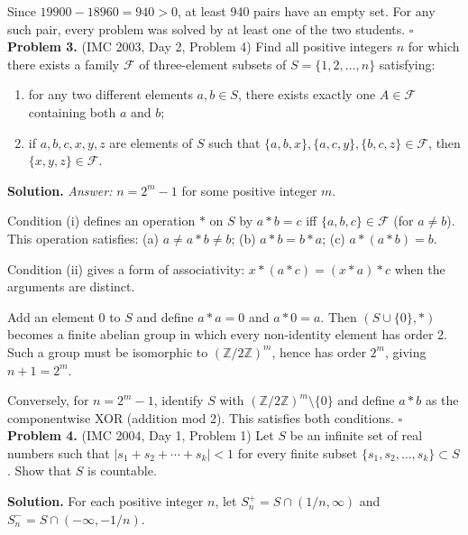\documentclass{article}
\begin{document}
Since \( 19900 - 18960 = 940 > 0 \), at least 940 pairs have an empty set. For any such pair, every problem was solved by at least one of the two students. \hfill\(\square\)
\\

\textbf{Problem 3.} (IMC 2003, Day 2, Problem 4)
Find all positive integers \( n \) for which there exists a family \( \mathcal{F} \) of three-element subsets of \( S = \{1, 2, \ldots, n\} \) satisfying:
\begin{enumerate}
    \item for any two different elements \( a, b \in S \), there exists exactly one \( A \in \mathcal{F} \) containing both \( a \) and \( b \);
    \item if \( a, b, c, x, y, z \) are elements of \( S \) such that \( \{a, b, x\}, \{a, c, y\}, \{b, c, z\} \in \mathcal{F} \), then \( \{x, y, z\} \in \mathcal{F} \).
\end{enumerate}

\textbf{Solution.}
\textit{Answer:} \( n = 2^m - 1 \) for some positive integer \( m \).

Condition (i) defines an operation \( * \) on \( S \) by \( a * b = c \) iff \( \{a,b,c\} \in \mathcal{F} \) (for \( a \neq b \)). This operation satisfies: (a) \( a \neq a*b \neq b \); (b) \( a*b = b*a \); (c) \( a*(a*b) = b \).

Condition (ii) gives a form of associativity: \( x*(a*c) = (x*a)*c \) when the arguments are distinct.

Add an element 0 to \( S \) and define \( a*a = 0 \) and \( a*0 = a \). Then \( (S \cup \{0\}, *) \) becomes a finite abelian group in which every non-identity element has order 2. Such a group must be isomorphic to \( (\mathbb{Z}/2\mathbb{Z})^m \), hence has order \( 2^m \), giving \( n + 1 = 2^m \).

Conversely, for \( n = 2^m - 1 \), identify \( S \) with \( (\mathbb{Z}/2\mathbb{Z})^m \setminus \{0\} \) and define \( a * b \) as the componentwise XOR (addition mod 2). This satisfies both conditions. \hfill\(\square\)
\\

\textbf{Problem 4.} (IMC 2004, Day 1, Problem 1)
Let \( S \) be an infinite set of real numbers such that \( |s_1 + s_2 + \cdots + s_k| < 1 \) for every finite subset \( \{s_1, s_2, \ldots, s_k\} \subset S \). Show that \( S \) is countable.

\textbf{Solution.}
For each positive integer \( n \), let \( S_n^+ = S \cap (1/n, \infty) \) and \( S_n^- = S \cap (-\infty, -1/n) \).
\end{document}
